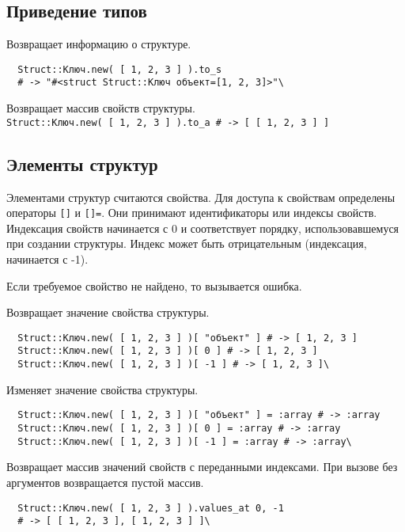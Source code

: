 \subsection*{Приведение типов} 

\begin{methodlist}
  Возвращает информацию о структуре.
  \begin{verbatim}
  Struct::Kлюч.new( [ 1, 2, 3 ] ).to_s 
  # -> "#<struct Struct::Kлюч объект=[1, 2, 3]>"\
  \end{verbatim} 

  Возвращает массив свойств структуры. 
  \\\verb!Struct::Kлюч.new( [ 1, 2, 3 ] ).to_a # -> [ [ 1, 2, 3 ] ]!
\end{methodlist}

\subsection*{Элементы структур}

Элементами структур считаются свойства. Для доступа к свойствам определены операторы \verb![]! и \verb![]=!. Они принимают идентификаторы или индексы свойств. Индексация свойств начинается с 0 и соответствует порядку, использовавшемуся при создании структуры. Индекс может быть отрицательным (индексация, начинается с -1).

Если требуемое свойство не найдено, то вызывается ошибка. 

\begin{methodlist}
  Возвращает значение свойства структуры.
  \begin{verbatim}
  Struct::Kлюч.new( [ 1, 2, 3 ] )[ "объект" ] # -> [ 1, 2, 3 ]
  Struct::Kлюч.new( [ 1, 2, 3 ] )[ 0 ] # -> [ 1, 2, 3 ] 
  Struct::Kлюч.new( [ 1, 2, 3 ] )[ -1 ] # -> [ 1, 2, 3 ]\
  \end{verbatim}

  Изменяет значение свойства структуры.
  \begin{verbatim}
  Struct::Kлюч.new( [ 1, 2, 3 ] )[ "объект" ] = :array # -> :array
  Struct::Kлюч.new( [ 1, 2, 3 ] )[ 0 ] = :array # -> :array 
  Struct::Kлюч.new( [ 1, 2, 3 ] )[ -1 ] = :array # -> :array\
  \end{verbatim} 
 
  \declare{struct.values_at(*integer)}{\# -> array}
  Возвращает массив значений свойств с переданными индексами. При вызове без аргументов возвращается пустой массив.
  \begin{verbatim}
  Struct::Kлюч.new( [ 1, 2, 3 ] ).values_at 0, -1 
  # -> [ [ 1, 2, 3 ], [ 1, 2, 3 ] ]\
  \end{verbatim} 
\end{methodlist}

